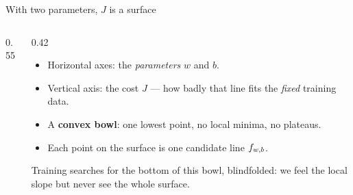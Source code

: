 \documentclass[aspectratio=169,11pt]{beamer}
\begin{document}
\begin{frame}{With two parameters, $J$ is a surface}
  \begin{columns}[T,onlytextwidth]
    \begin{column}{0.55\textwidth}
      \centering
    \end{column}
    \begin{column}{0.42\textwidth}
      \footnotesize
      \begin{itemize}
        \item Horizontal axes: the \emph{parameters} $w$ and $b$.
        \item Vertical axis: the cost $J$ --- how badly that line fits the
              \emph{fixed} training data.
        \item A \textbf{convex bowl}: one lowest point, no local minima, no
              plateaus.
        \item Each point on the surface is one candidate line $f_{w,b}$.
      \end{itemize}
      \begin{keyidea}
        Training searches for the bottom of this bowl, blindfolded: we feel the
        local slope but never see the whole surface.
      \end{keyidea}
    \end{column}
  \end{columns}
\end{frame}
\end{document}
